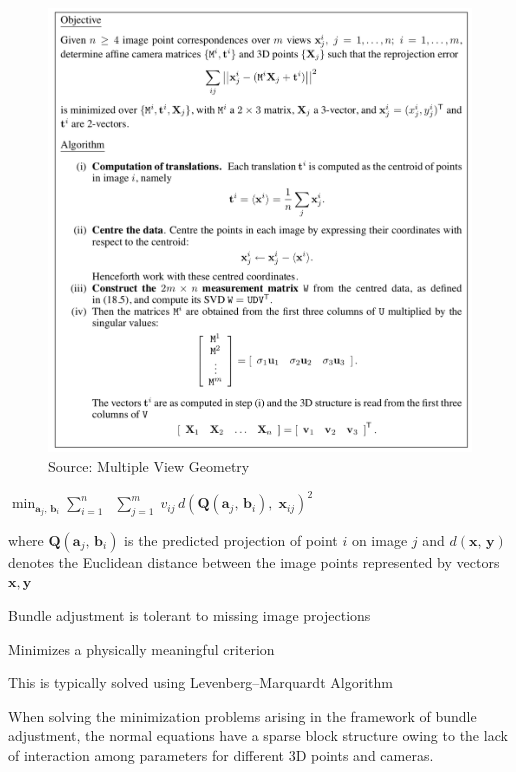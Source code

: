 \begin{figure}[h]
\includegraphics[width=1.0\columnwidth]{cv_figures/ml_bundle.png}
\caption{Source: Multiple View Geometry}
\end{figure}

$\min _{{{\mathbf  {a}}_{j},\,{\mathbf  {b}}_{i}}} \sum _{{i=1}}^{{n}}\; $
$ \sum _{{j=1}}^{{m}}\;v_{{ij}}\,d({\mathbf  {Q}}({\mathbf  {a}}_{j},\,{\mathbf  {b}}_{i}),\;{\mathbf{x}}_{{ij}})^{2}$

where $\mathbf {Q} (\mathbf {a} _{j},\,\mathbf {b} _{i})$ is the predicted projection of point $i$ on image $j$ and $d(\mathbf {x} ,\,\mathbf {y} )$  denotes the Euclidean distance between the image points represented by vectors $\mathbf{x,y}$

Bundle adjustment is tolerant to missing image projections 

Minimizes a physically meaningful criterion

This is typically solved using Levenberg–Marquardt Algorithm

When solving the minimization problems arising in the framework of bundle adjustment, the normal equations have a sparse block structure owing to the lack of interaction among parameters for different 3D points and cameras.

